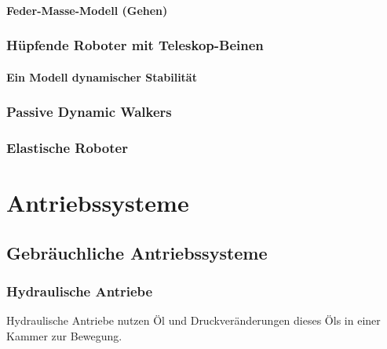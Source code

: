 \documentclass[a4paper, 11pt, accentcolor = tud3b]{tudreport}
\begin{document}
				\subsubsection{Feder-Masse-Modell (Gehen)} %

			\subsection{Hüpfende Roboter mit Teleskop-Beinen} %

				\subsubsection{Ein Modell dynamischer Stabilität} %

			\subsection{Passive Dynamic Walkers} %

			\subsection{Elastische Roboter} %

	\chapter{Antriebssysteme}
		\section{Gebräuchliche Antriebssysteme}
			\subsection{Hydraulische Antriebe}
				Hydraulische Antriebe nutzen Öl und Druckveränderungen dieses Öls in einer Kammer zur Bewegung.
				
\end{document}
